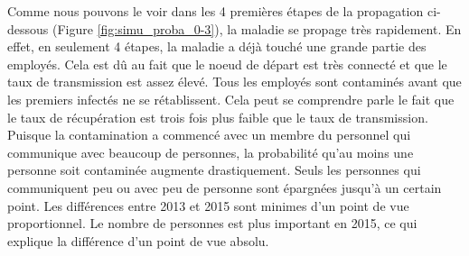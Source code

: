 \documentclass{article}
\begin{document}
Comme nous pouvons le voir dans les 4 premières étapes de la propagation ci-dessous (Figure \ref{fig:simu_proba_0-3}), la maladie se propage très rapidement. En effet, en seulement 4 étapes, la maladie a déjà touché une grande partie des employés. Cela est dû au fait que le noeud de départ est très connecté et que le taux de transmission est assez élevé. Tous les employés sont contaminés avant que les premiers infectés ne se rétablissent. Cela peut se comprendre parle le fait que le taux de récupération est trois fois plus faible que le taux de transmission. Puisque la contamination a commencé avec un membre du personnel qui communique avec beaucoup de personnes, la probabilité qu'au moins une personne soit contaminée augmente drastiquement. Seuls les personnes qui communiquent peu ou avec peu de personne sont épargnées jusqu'à un certain point. Les différences entre 2013 et 2015 sont minimes d'un point de vue proportionnel. Le nombre de personnes est plus important en 2015, ce qui explique la différence d'un point de vue absolu.
\end{document}

